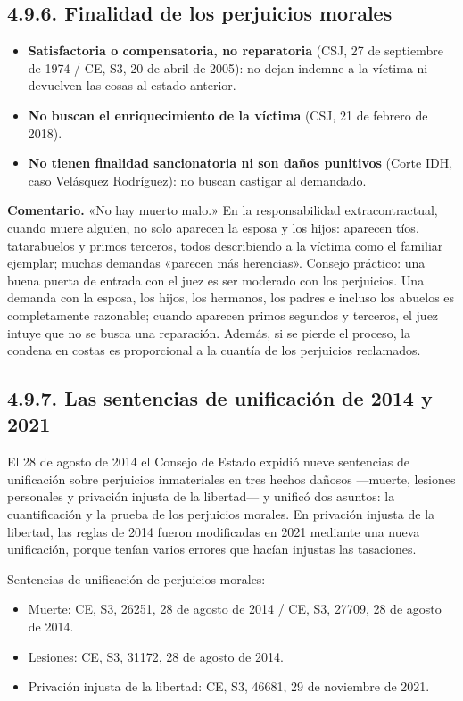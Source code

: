 \subsection{4.9.6. Finalidad de los perjuicios morales}
\begin{itemize}
\item \textbf{Satisfactoria o compensatoria, no reparatoria} (CSJ, 27 de septiembre de 1974 / CE, S3, 20 de abril de 2005): no dejan indemne a la víctima ni devuelven las cosas al estado anterior.
\item \textbf{No buscan el enriquecimiento de la víctima} (CSJ, 21 de febrero de 2018).
\item \textbf{No tienen finalidad sancionatoria ni son daños punitivos} (Corte IDH, caso Velásquez Rodríguez): no buscan castigar al demandado.
\end{itemize}
\begin{comentario}
\textcolor[HTML]{8A6D3B}{\textbf{Comentario. }}«No hay muerto malo.» En la responsabilidad extracontractual, cuando muere alguien, no solo aparecen la esposa y los hijos: aparecen tíos, tatarabuelos y primos terceros, todos describiendo a la víctima como el familiar ejemplar; muchas demandas «parecen más herencias». Consejo práctico: una buena puerta de entrada con el juez es ser moderado con los perjuicios. Una demanda con la esposa, los hijos, los hermanos, los padres e incluso los abuelos es completamente razonable; cuando aparecen primos segundos y terceros, el juez intuye que no se busca una reparación. Además, si se pierde el proceso, la condena en costas es proporcional a la cuantía de los perjuicios reclamados.
\end{comentario}
\subsection{4.9.7. Las sentencias de unificación de 2014 y 2021}
El 28 de agosto de 2014 el Consejo de Estado expidió nueve sentencias de unificación sobre perjuicios inmateriales en tres hechos dañosos —muerte, lesiones personales y privación injusta de la libertad— y unificó dos asuntos: la cuantificación y la prueba de los perjuicios morales. En privación injusta de la libertad, las reglas de 2014 fueron modificadas en 2021 mediante una nueva unificación, porque tenían varios errores que hacían injustas las tasaciones.

Sentencias de unificación de perjuicios morales:

\begin{itemize}
\item Muerte: CE, S3, 26251, 28 de agosto de 2014 / CE, S3, 27709, 28 de agosto de 2014.
\item Lesiones: CE, S3, 31172, 28 de agosto de 2014.
\item Privación injusta de la libertad: CE, S3, 46681, 29 de noviembre de 2021.
\end{itemize}
